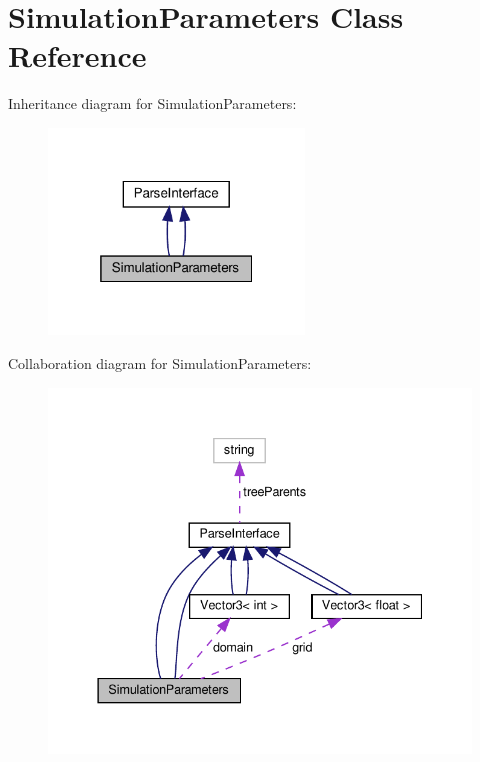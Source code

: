 \hypertarget{classSimulationParameters}{}\section{Simulation\+Parameters Class Reference}
\label{classSimulationParameters}


Inheritance diagram for Simulation\+Parameters\+:
\nopagebreak
\begin{figure}[H]
\begin{center}
\leavevmode
\includegraphics[width=193pt]{classSimulationParameters__inherit__graph}
\end{center}
\end{figure}


Collaboration diagram for Simulation\+Parameters\+:
\nopagebreak
\begin{figure}[H]
\begin{center}
\leavevmode
\includegraphics[width=337pt]{classSimulationParameters__coll__graph}
\end{center}
\end{figure}
